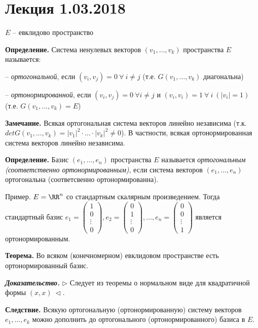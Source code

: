 \section{Лекция 1.03.2018}

$E$ -- евклидово пространство

\textbf{Определение.} Система ненулевых векторов $(v_1, \dots, v_k)$ пространства $E$ называется:

-- \textit{ортогональной}, если $(v_i, v_j) = 0 \ \forall \ i \neq j$ (т.е. $G(v_1, \dots, v_k)$ диагональна)

-- \textit{ортонормированной}, если $(v_i, v_j) = 0 \ \forall i \neq j$ и $(v_i, v_i) = 1 \ \forall \ i \ (|v_i| = 1)$ (т.е. $G(v_1, \dots, v_k) = E$)

\bigskip
\textbf{Замечание.} Всякая ортогональная система векторов линейно независима (т.к. $det G(v_1, \dots, v_k) = |v_1|^2 \cdot \dots \cdot |v_k|^2 \neq 0$). В частности, всякая ортонормированная система векторов линейно независима.

\bigskip
\textbf{Определение.} Базис $(e_1, \dots, e_n)$ пространства $E$ называется \textit{ортогональным (соответственно ортонормированным)}, если система векторов $(e_1, \dots, e_n)$ ортогональна (соответсвенно ортонормированна).

\bigskip
Пример. 
$E = \RR^n$ со стандартным скалярным произведением. Тогда стандартный базис $e_1 = \begin{pmatrix} 1 \\ 0 \\ \vdots \\ 0 \end{pmatrix}, e_2 = \begin{pmatrix} 0 \\ 1 \\ \vdots \\ 0 \end{pmatrix}, \dots, e_n = \begin{pmatrix} 0 \\ 0 \\ \vdots \\ 1 \end{pmatrix}$ является ортонормированным.

\bigskip
\textbf{Теорема.} Во всяком (конечномерном) евклидовом пространстве есть ортонормированный базис.

\bigskip
\textbf{\textit{Доказательство.}} $\rhd$ Следует из теоремы о нормальном виде для квадратичной формы $(x, x) \ \lhd$.

\bigskip
\textbf{Следствие.} Всякую ортогональную (ортонормированную) систему векторов $e_1, \dots, e_k$  можно дополнить до ортогонального (ортонормированного) базиса в $E$.

